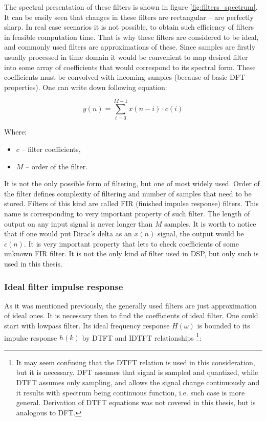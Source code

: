 \documentclass[magister]{dyplom}
\begin{document}
	The spectral presentation of these filters is shown in figure \ref{fig:filters_spectrum}. It can be easily seen that changes in these filters are rectangular -- are perfectly sharp. In real case scenarios it is not possible, to obtain such efficiency of filters in feasible computation time. That is why these filters are considered to be ideal, and commonly used filters are approximations of these. Since samples are firstly usually processed in time domain it would be convenient to map desired filter into some array of coefficients that would correspond to its spectral form. These coefficients must be convolved with incoming samples (because of basic \gls{DFT} properties). One can write down following equation:
	
	\begin{equation}
		y(n) = \sum_{i=0}^{M-1} x(n-i) \cdot c(i)		
	\end{equation}
	
	Where:
	
	\begin{itemize}
		\item $c$ -- filter coefficients,
		\item $M$ -- order of the filter.
	\end{itemize}
	
	It is not the only possible form of filtering, but one of most widely used. Order of the filter defines complexity of filtering and number of samples that need to be stored. Filters of this kind are called \gls{FIR} (finished impulse response) filters. This name is corresponding to very important property of such filter. The length of output on any input signal is never longer than $M$ samples. It is worth to notice that if one would put Dirac's delta as an $x(n)$ signal, the output would be $c(n)$. It is very important property that lets to check coefficients of some unknown \gls{FIR} filter. It is not the only kind of filter used in \gls{DSP}, but only such is used in this thesis.
	
	\subsubsection{Ideal filter impulse response}
	
	As it was mentioned previously, the generally used filters are just approximation of ideal ones. It is necessary then to find the coefficients of ideal filter. One could start with lowpass filter. Its ideal frequency response $H(\omega)$ is bounded to its impulse response $h(k)$ by \gls{DTFT} and \gls{IDTFT} relationships \footnote{It may seem confusing that the \gls{DTFT} relation is used in this consideration, but it is necessary. \gls{DFT} assumes that signal is sampled and quantized, while \gls{DTFT} assumes only sampling, and allows the signal change continuously and it results with spectrum being continuous function, i.e. such case is more general. Derivation of \gls{DTFT} equations was not covered in this thesis, but is analogous to \gls{DFT}.}:
	
\end{document}
